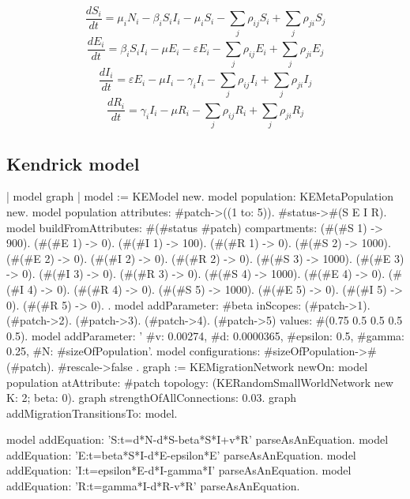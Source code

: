 \documentclass[a4paper,10pt,twoside]{book}
\begin{document}
  \begin{equation}
    \frac{dS_i}{dt} = \mu_i N_i - \beta_i S_i I_i - \mu_i S_i - \sum_j \rho_{ij} S_i + \sum_j \rho_{ji} S_j
  \end{equation}
  \begin{equation}
    \frac{dE_i}{dt} = \beta_i S_i I_i - \mu E_i - \varepsilon E_i - \sum_j \rho_{ij} E_i + \sum_j \rho_{ji} E_j
  \end{equation}
  \begin{equation}
    \frac{dI_i}{dt} = \varepsilon E_i - \mu I_i - \gamma_i I_i - \sum_j \rho_{ij} I_i + \sum_j \rho_{ji} I_j
  \end{equation}
  \begin{equation}
    \frac{dR_i}{dt} = \gamma_i I_i - \mu R_i - \sum_j \rho_{ij} R_i + \sum_j \rho_{ji} R_j
  \end{equation}
  
\subsection{ Kendrick model}

\begin{code}{}
| model graph |
model := KEModel new.
model population: KEMetaPopulation new.
model population attributes: {
	#patch->((1 to: 5)).
	#status->#(S E I R)}.
model
	buildFromAttributes: #(#status #patch)
	compartments: {
		  (#(#S 1) -> 900). (#(#E 1) -> 0). (#(#I 1) -> 100). (#(#R 1) -> 0).
        (#(#S 2) -> 1000). (#(#E 2) -> 0). (#(#I 2) -> 0). (#(#R 2) -> 0).
        (#(#S 3) -> 1000). (#(#E 3) -> 0). (#(#I 3) -> 0). (#(#R 3) -> 0).
        (#(#S 4) -> 1000). (#(#E 4) -> 0). (#(#I 4) -> 0). (#(#R 4) -> 0).
        (#(#S 5) -> 1000). (#(#E 5) -> 0). (#(#I 5) -> 0). (#(#R 5) -> 0).
	}.
model
	addParameter: #beta
	inScopes: {
		(#patch->1).
		(#patch->2).
		(#patch->3).
		(#patch->4).
		(#patch->5)
	}
	values: #(0.75 0.5 0.5 0.5 0.5).
model addParameter: '{
	#v: 0.00274,
	#d: 0.0000365,
	#epsilon: 0.5,
	#gamma: 0.25,
	#N: #sizeOfPopulation}'.
model configurations: {
		#sizeOfPopulation->#(#patch).
		#rescale->false }.
graph := KEMigrationNetwork
				newOn: model population
				atAttribute: #patch
				topology: (KERandomSmallWorldNetwork new K: 2; beta: 0).
graph strengthOfAllConnections: 0.03.
graph addMigrationTransitionsTo: model.

model addEquation: 'S:t=d*N-d*S-beta*S*I+v*R' parseAsAnEquation.
model addEquation: 'E:t=beta*S*I-d*E-epsilon*E' parseAsAnEquation.
model addEquation: 'I:t=epsilon*E-d*I-gamma*I' parseAsAnEquation.
model addEquation: 'R:t=gamma*I-d*R-v*R' parseAsAnEquation.
\end{code}
\end{document}
